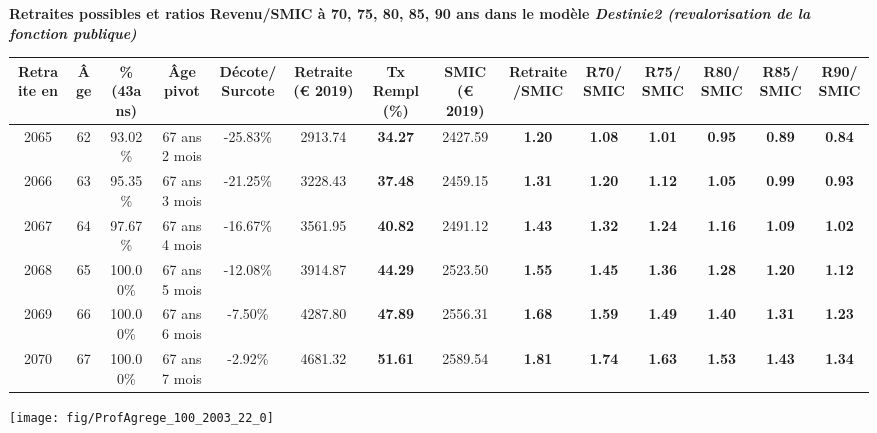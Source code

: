  \vspace{0.1cm} 
{\bf \noindent Retraites possibles et ratios Revenu/SMIC à 70, 75, 80, 85, 90 ans dans le modèle \emph{Destinie2 (revalorisation de la fonction publique)}}  
 
\begin{adjustbox}{max width=\textwidth} 
\begin{tabular}[htb]{|c|c||c|c|c||c|c||c|c||c|c|c|c|c|} 
\hline 
 Retraite en &  Âge &  \%(43ans) &  Âge pivot &  Décote/Surcote &  Retraite (\euro{} 2019) &  Tx Rempl(\%) &  SMIC (\euro{} 2019) &  Retraite/SMIC &  R70/SMIC &  R75/SMIC &  R80/SMIC &  R85/SMIC &  R90/SMIC \\ 
\hline \hline 
 2065 &  62 &  93.02\% &  67 ans 2 mois &  -25.83\% &  2913.74 &  {\bf 34.27} &  2427.59 &  {\bf 1.20} &  {\bf 1.08} &  {\bf 1.01} &  {\bf {\color{red} 0.95}} &  {\bf {\color{red} 0.89}} &  {\bf {\color{red} 0.84}} \\ 
\hline 
 2066 &  63 &  95.35\% &  67 ans 3 mois &  -21.25\% &  3228.43 &  {\bf 37.48} &  2459.15 &  {\bf 1.31} &  {\bf 1.20} &  {\bf 1.12} &  {\bf 1.05} &  {\bf {\color{red} 0.99}} &  {\bf {\color{red} 0.93}} \\ 
\hline 
 2067 &  64 &  97.67\% &  67 ans 4 mois &  -16.67\% &  3561.95 &  {\bf 40.82} &  2491.12 &  {\bf 1.43} &  {\bf 1.32} &  {\bf 1.24} &  {\bf 1.16} &  {\bf 1.09} &  {\bf 1.02} \\ 
\hline 
 2068 &  65 &  100.00\% &  67 ans 5 mois &  -12.08\% &  3914.87 &  {\bf 44.29} &  2523.50 &  {\bf 1.55} &  {\bf 1.45} &  {\bf 1.36} &  {\bf 1.28} &  {\bf 1.20} &  {\bf 1.12} \\ 
\hline 
 2069 &  66 &  100.00\% &  67 ans 6 mois &  -7.50\% &  4287.80 &  {\bf 47.89} &  2556.31 &  {\bf 1.68} &  {\bf 1.59} &  {\bf 1.49} &  {\bf 1.40} &  {\bf 1.31} &  {\bf 1.23} \\ 
\hline 
 2070 &  67 &  100.00\% &  67 ans 7 mois &  -2.92\% &  4681.32 &  {\bf 51.61} &  2589.54 &  {\bf 1.81} &  {\bf 1.74} &  {\bf 1.63} &  {\bf 1.53} &  {\bf 1.43} &  {\bf 1.34} \\ 
\hline 
\hline 
\end{tabular} 
\end{adjustbox} 
 
 \vspace{0.1cm} 

 {\hspace{-2.2cm}\texttt{[image: fig/ProfAgrege\_100\_2003\_22\_0]}} 

\newpage 
 
